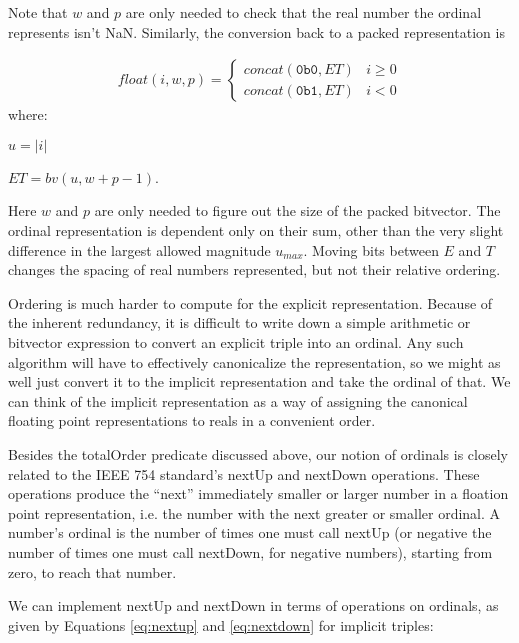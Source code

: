 \documentclass[letterpaper,10pt]{article}
\begin{document}
Note that $w$ and $p$ are only needed to check that the real number the ordinal represents isn't NaN. Similarly, the conversion back to a packed representation is

\begin{align} \label{eq:ord4}
 float(i, w, p) = 
 \begin{cases}
  concat(\texttt{0b0}, ET) & i \geq 0 \\
  concat(\texttt{0b1}, ET) & i < 0
 \end{cases}
\end{align}
where:
\begin{description}
 \item $u = \lvert i \rvert$
 \item $ET = bv(u, w + p - 1)$.
\end{description}

Here $w$ and $p$ are only needed to figure out the size of the packed bitvector. The ordinal representation is dependent only on their sum, other than the very slight difference in the largest allowed magnitude $u_{max}$. Moving bits between $E$ and $T$ changes the spacing of real numbers represented, but not their relative ordering.

Ordering is much harder to compute for the explicit representation. Because of the inherent redundancy, it is difficult to write down a simple arithmetic or bitvector expression to convert an explicit triple into an ordinal. Any such algorithm will have to effectively canonicalize the representation, so we might as well just convert it to the implicit representation and take the ordinal of that. We can think of the implicit representation as a way of assigning the canonical floating point representations to reals in a convenient order.

Besides the totalOrder predicate discussed above, our notion of ordinals is closely related to the IEEE 754 standard's nextUp and nextDown operations. These operations produce the ``next'' immediately smaller or larger number in a floation point representation, i.e. the number with the next greater or smaller ordinal. A number's ordinal is the number of times one must call nextUp (or negative the number of times one must call nextDown, for negative numbers), starting from zero, to reach that number.

We can implement nextUp and nextDown in terms of operations on ordinals, as given by Equations \ref{eq:nextup} and \ref{eq:nextdown} for implicit triples:
\end{document}
